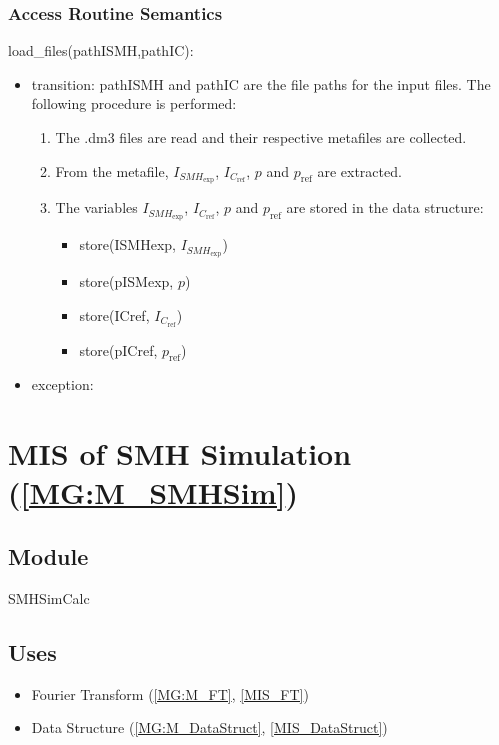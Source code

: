 \documentclass[12pt, titlepage]{article}
\begin{document}
\subsubsection{Access Routine Semantics}

\noindent load{\_}files(pathISMH,pathIC):
\begin{itemize}
\item transition: pathISMH and pathIC are the file paths for the input files. The following procedure is performed:
\begin{enumerate}
\item The .dm3 files are read and their respective  metafiles are collected.
\item From the metafile, $I_{\mathit{SMH}_{\text{exp}}}$, $I_{C_{\text{ref}}}$, $p$ and $p_{\text{ref}}$ are extracted.
\item The variables $I_{\mathit{SMH}_{\text{exp}}}$, $I_{C_{\text{ref}}}$, $p$ and $p_{\text{ref}}$ are stored in the data structure:
\begin{itemize}
\item store(ISMHexp, $I_{\mathit{SMH}_{\text{exp}}}$)
\item store(pISMexp, $p$)
\item store(ICref, $I_{C_{\text{ref}}}$)
\item store(pICref, $p_{\text{ref}}$)
\end{itemize}
\end{enumerate}   
\item exception: 
\end{itemize}

\section{MIS of SMH Simulation (\texorpdfstring{\cref{MG:M_SMHSim}}))} \label{MIS_SMHSim}

\subsection{Module}
SMHSimCalc
\subsection{Uses}
\begin{itemize}
\item Fourier Transform (\cref{MG:M_FT}, \cref{MIS_FT})
\item Data Structure (\cref{MG:M_DataStruct}, \cref{MIS_DataStruct})
\end{itemize}
\end{document}
